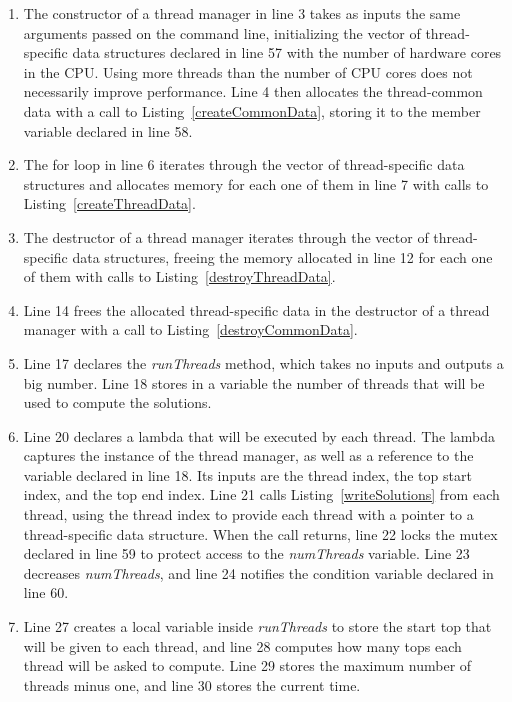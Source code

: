 \begin{enumerate}
\addtocounter{enumi}{2}
\item The constructor of a thread manager in line 3 takes as inputs the same arguments passed on the command line, initializing the vector of thread-specific data structures declared in line 57 with the number of hardware cores in the CPU. Using more threads than the number of CPU cores does not necessarily improve performance. Line 4 then allocates the thread-common data with a call to Listing~\ref{createCommonData}, storing it to the member variable declared in line 58.
\addtocounter{enumi}{2}
\item The for loop in line 6 iterates through the vector of thread-specific data structures and allocates memory for each one of them in line 7 with calls to Listing~\ref{createThreadData}.
\addtocounter{enumi}{4}
\item The destructor of a thread manager iterates through the vector of thread-specific data structures, freeing the memory allocated in line 12 for each one of them with calls to Listing~\ref{destroyThreadData}.
\addtocounter{enumi}{2}
\item Line 14 frees the allocated thread-specific data in the destructor of a thread manager with a call to Listing~\ref{destroyCommonData}.
\addtocounter{enumi}{2}
\item Line 17 declares the \emph{runThreads} method, which takes no inputs and outputs a big number. Line 18 stores in a variable the number of threads that will be used to compute the solutions.
\addtocounter{enumi}{2}
\item Line 20 declares a lambda that will be executed by each thread. The lambda captures the instance of the thread manager, as well as a reference to the variable declared in line 18. Its inputs are the thread index, the top start index, and the top end index. Line 21 calls Listing~\ref{writeSolutions} from each thread, using the thread index to provide each thread with a pointer to a thread-specific data structure. When the call returns, line 22 locks the mutex declared in line 59 to protect access to the \emph{numThreads} variable. Line 23 decreases \emph{numThreads}, and line 24 notifies the condition variable declared in line 60.
\addtocounter{enumi}{6}
\item Line 27 creates a local variable inside \emph{runThreads} to store the start top that will be given to each thread, and line 28 computes how many tops each thread will be asked to compute. Line 29 stores the maximum number of threads minus one, and line 30 stores the current time.

\end{enumerate}
